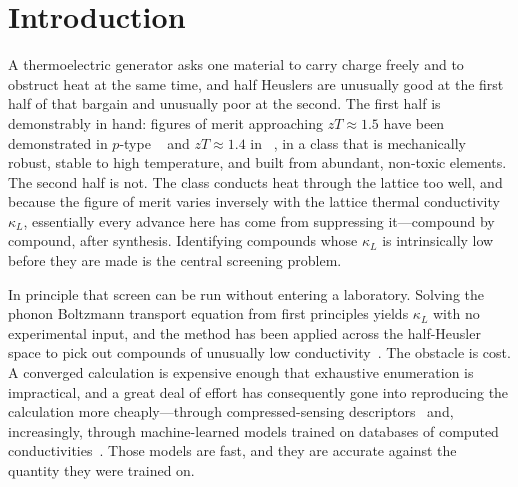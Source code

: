 %
%
%

\section{Introduction}
\label{sec:intro}

A thermoelectric generator asks one material to carry charge freely and to obstruct heat at the
same time, and half Heuslers are unusually good at the first half of that bargain and unusually
poor at the second. The first half is demonstrably in hand: figures of merit approaching
$zT \approx 1.5$ have been demonstrated in $p$-type ~\cite{fu2015realizing} and
$zT \approx 1.4$ in ~\cite{zhu2018discovery}, in a class that is mechanically robust,
stable to high temperature, and built from abundant, non-toxic elements. The second half is not.
The class conducts heat through the lattice too well, and because the figure of merit varies
inversely with the lattice thermal conductivity $\kappa_L$, essentially every advance here has come
from suppressing it---compound by compound, after synthesis. Identifying compounds whose $\kappa_L$
is intrinsically low before they are made is the central screening problem.

In principle that screen can be run without entering a laboratory. Solving the phonon Boltzmann
transport equation from first principles yields $\kappa_L$ with no experimental input, and the
method has been applied across the half-Heusler space to pick out compounds of unusually low
conductivity~\cite{carrete2014finding}. The obstacle is cost. A converged calculation is expensive
enough that exhaustive enumeration is impractical, and a great deal of effort has consequently gone
into reproducing the calculation more cheaply---through compressed-sensing
descriptors~\cite{liu2020a} and, increasingly, through machine-learned models trained on databases
of computed
conductivities~\cite{luo2023predicting,trans2022lattice,miyazaki2021machine,jaafreh2021lattice,bhattacharjee2022thorough,paliwal2025accelerate}.
Those models are fast, and they are accurate against the quantity they were trained on.

